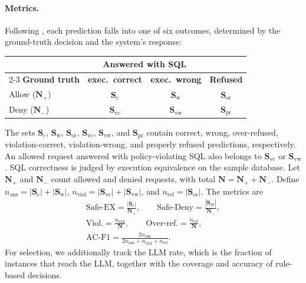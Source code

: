 \documentclass[11pt,a4paper]{article}
\begin{document}
\paragraph{Metrics.}
Following \citet{fei2026benchmarkingtexttosqlrolebasedaccess}, each prediction falls into one of six outcomes, determined by the ground-truth decision and the system's response:
\begin{center}
\footnotesize
\renewcommand{\arraystretch}{1.15}
\setlength{\tabcolsep}{5pt}
\begin{tabular}{lccc}
\toprule
& \multicolumn{2}{c}{\textbf{Answered with SQL}} & \\
\cmidrule(lr){2-3}
\textbf{Ground truth} & \textbf{exec.\ correct} & \textbf{exec.\ wrong} & \textbf{Refused} \\
\midrule
Allow ($\mathbf{N}_{+}$) & $\mathbf{S}_{\mathrm{c}}$ & $\mathbf{S}_{\mathrm{w}}$ & $\mathbf{S}_{\mathrm{or}}$ \\
Deny ($\mathbf{N}_{-}$) & $\mathbf{S}_{\mathrm{vc}}$ & $\mathbf{S}_{\mathrm{vw}}$ & $\mathbf{S}_{\mathrm{pr}}$ \\
\bottomrule
\end{tabular}
\end{center}
The sets $\mathbf{S}_{\mathrm{c}}$, $\mathbf{S}_{\mathrm{w}}$, $\mathbf{S}_{\mathrm{or}}$, $\mathbf{S}_{\mathrm{vc}}$, $\mathbf{S}_{\mathrm{vw}}$, and $\mathbf{S}_{\mathrm{pr}}$ contain correct, wrong, over-refused, violation-correct, violation-wrong, and properly refused predictions, respectively. An allowed request answered with policy-violating SQL also belongs to $\mathbf{S}_{\mathrm{vc}}$ or $\mathbf{S}_{\mathrm{vw}}$. SQL correctness is judged by execution equivalence on the sample database. Let $\mathbf{N}_{+}$ and $\mathbf{N}_{-}$ count allowed and denied requests, with total $\mathbf{N}=\mathbf{N}_{+}+\mathbf{N}_{-}$. Define $n_{\mathrm{ans}}=|\mathbf{S}_{\mathrm{c}}|+|\mathbf{S}_{\mathrm{w}}|$, $n_{\mathrm{viol}}=|\mathbf{S}_{\mathrm{vc}}|+|\mathbf{S}_{\mathrm{vw}}|$, and $n_{\mathrm{ref}}=|\mathbf{S}_{\mathrm{or}}|$. The metrics are
\begin{equation*}
\begin{gathered}
\text{Safe-EX}=\frac{|\mathbf{S}_{\mathrm{c}}|}{\mathbf{N}_{+}},\qquad
\text{Safe-Deny}=\frac{|\mathbf{S}_{\mathrm{pr}}|}{\mathbf{N}_{-}},\\[5pt]
\text{Viol.}=\frac{n_{\mathrm{viol}}}{\mathbf{N}},\qquad
\text{Over-ref.}=\frac{n_{\mathrm{ref}}}{\mathbf{N}},\\[5pt]
\text{AC-F1}=\frac{2n_{\mathrm{ans}}}{2n_{\mathrm{ans}}+n_{\mathrm{viol}}+n_{\mathrm{ref}}}.
\end{gathered}
\end{equation*}
For selection, we additionally track the LLM rate, which is the fraction of instances that reach the LLM, together with the coverage and accuracy of rule-based decisions.
\end{document}

